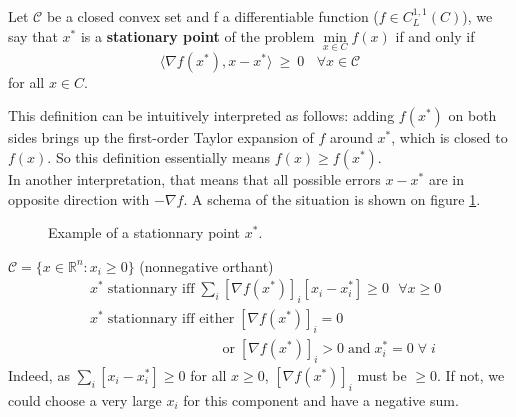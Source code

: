 \begin{definition}
Let $\mathcal{C}$ be a closed convex set and f a differentiable function ($f \in C_L^{1,1}(C)$), we say that $x^*$ is a \textbf{stationary point} of the problem $\min\limits_{x \in C} f(x)$ if and only if
\begin{equation*}
\langle \nabla f(x^*), x-x^* \rangle \ \geq\ 0 \ \ \ \ \forall x \in \mathcal{C}
\end{equation*}
for all $x \in C$.
\end{definition}
This definition can be intuitively interpreted as follows: adding $f(x^*)$ on both sides brings up the first-order Taylor expansion of $f$ around $x^*$, which is closed to $f(x)$. So this definition essentially means $f(x) \ge f(x^*)$.\\
In another interpretation, that means that all possible errors $x-x^*$ are in opposite direction with $-\nabla f$. A schema of the situation is shown on figure \ref{tik1}.
\begin{figure}[H]
\centering
{}
\caption{Example of a stationnary point $x^*$.}
\label {tik1}
\end{figure}

\begin{example}
\begin{leftbar}
 $\mathcal{C} = \{x \in \mathbb{R}^n: x_i \ge 0\}$ (nonnegative orthant)
\begin{align*}
&x^* \; \text{stationnary iff} \; \sum_i \left[\nabla f(x^*)\right]_i \left[x_i - x_i^*\right] \ge 0\ \ \ \forall x\ge 0\\
&x^* \; \text{stationnary iff either} \; [\nabla f(x^*)]_i=0\\ 
&\phantom{x^* \; \text{stationnary iff eith}}\text{or} \; [\nabla f(x^*)]_i>0 \; \text{and} \; x_i^*=0 \; \forall \; i
\end{align*}
Indeed, as $\sum_i [x_i - x_i^*] \ge 0$ for all $x\ge0$,  $[\nabla f(x^*)]_i$ must be $\ge 0$.
If not, we could choose a very large $x_i$ for this component and have a negative sum.
\end{leftbar}
\end{example}

